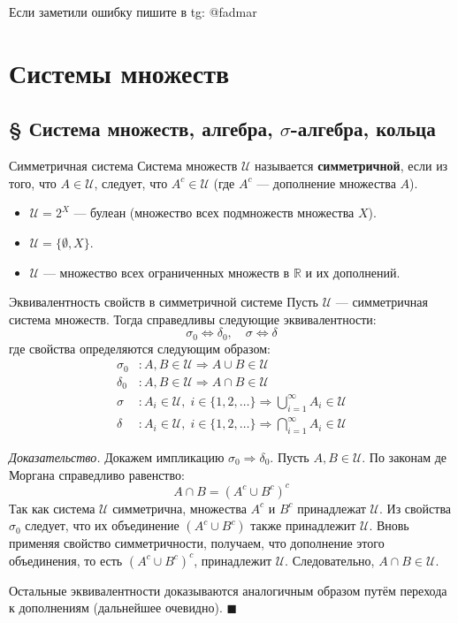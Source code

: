 \documentclass[12pt,a4paper]{article}
\newenvironment{Proof}[1][Доказательство]{\vspace{0.5em}\noindent\textit{#1.}\hspace{0.5em}\ignorespaces}{\hfill$\blacksquare$\vspace{1em}}
\begin{document}
Если заметили ошибку пишите в tg: @fadmar
\tableofcontents
\section{Системы множеств}
\subsection{§ Система множеств, алгебра, $\sigma$-алгебра, кольца}

\begin{Definition}{Симметричная система}{}
Система множеств $\mathcal{U}$ называется \textbf{симметричной}, если из того, что $A \in \mathcal{U}$, следует, что $A^c \in \mathcal{U}$ (где $A^c$ — дополнение множества $A$).
\end{Definition}

\begin{Example}
\begin{itemize}
    \item $\mathcal{U} = 2^X$ — булеан (множество всех подмножеств множества $X$).
    \item $\mathcal{U} = \{\emptyset, X\}$.
    \item $\mathcal{U}$ — множество всех ограниченных множеств в $\mathbb{R}$ и их дополнений.
\end{itemize}
\end{Example}

\begin{Theorem}{Эквивалентность свойств в симметричной системе}{}
Пусть $\mathcal{U}$ — симметричная система множеств. Тогда справедливы следующие эквивалентности:
$$ \sigma_0 \Leftrightarrow \delta_0, \quad \sigma \Leftrightarrow \delta $$
где свойства определяются следующим образом:
\begin{align*}
    \sigma_0 &: A, B \in \mathcal{U} \Rightarrow A \cup B \in \mathcal{U} \\
    \delta_0 &: A, B \in \mathcal{U} \Rightarrow A \cap B \in \mathcal{U} \\
    \sigma &: A_i \in \mathcal{U}, \; i \in \{1, 2, \dots\} \Rightarrow \bigcup_{i=1}^{\infty} A_i \in \mathcal{U} \\
    \delta &: A_i \in \mathcal{U}, \; i \in \{1, 2, \dots\} \Rightarrow \bigcap_{i=1}^{\infty} A_i \in \mathcal{U}
\end{align*}
\end{Theorem}

\begin{Proof}
Докажем импликацию $\sigma_0 \Rightarrow \delta_0$. Пусть $A, B \in \mathcal{U}$. 
По законам де Моргана справедливо равенство:
$$ A \cap B = (A^c \cup B^c)^c $$
Так как система $\mathcal{U}$ симметрична, множества $A^c$ и $B^c$ принадлежат $\mathcal{U}$. Из свойства $\sigma_0$ следует, что их объединение $(A^c \cup B^c)$ также принадлежит $\mathcal{U}$. Вновь применяя свойство симметричности, получаем, что дополнение этого объединения, то есть $(A^c \cup B^c)^c$, принадлежит $\mathcal{U}$. Следовательно, $A \cap B \in \mathcal{U}$.

Остальные эквивалентности доказываются аналогичным образом путём перехода к дополнениям (дальнейшее очевидно).
\end{Proof}
\end{document}
